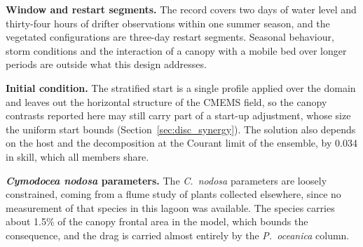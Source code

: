 \textbf{Window and restart segments.} The record covers two days of water level
and thirty-four hours of drifter observations within one summer season, and the
vegetated configurations are three-day restart segments. Seasonal behaviour,
storm conditions and
the interaction of a canopy with a mobile bed over longer periods are outside
what this design addresses.

\textbf{Initial condition.} The stratified start is a single profile applied
over the domain and leaves out the horizontal structure of the CMEMS field, so
the canopy contrasts reported here may still carry part of a start-up
adjustment, whose size the uniform start bounds
(Section~\ref{sec:disc_synergy}). The solution also depends on the host and the
decomposition at the Courant limit of the ensemble, by 0.034 in skill, which
all members share.

\textbf{\emph{Cymodocea nodosa} parameters.} The \emph{C.\ nodosa} parameters
are loosely constrained, coming from a flume study of plants collected
elsewhere, since no measurement of that species in this lagoon was available.
The species carries about 1.5\% of the canopy frontal area in the model, which
bounds the consequence, and the drag is carried almost entirely by the
\emph{P.\ oceanica} column.
